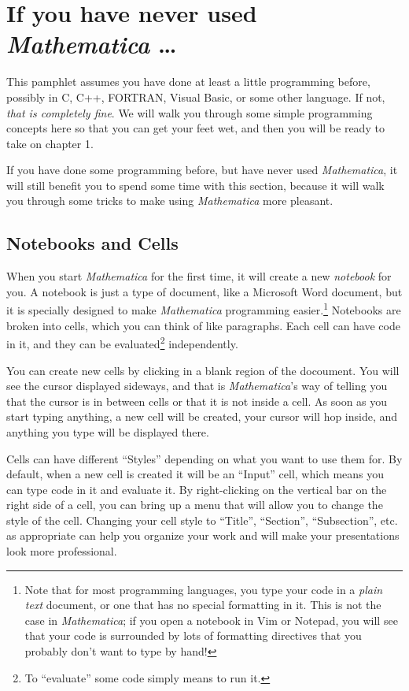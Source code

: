 \chapter*{If you have never used \emph{Mathematica} \ldots }
\label{chap:Prelim}

This pamphlet assumes you have done at least a little programming before, possibly in C, C++, FORTRAN, Visual Basic, or some other language. If not, \emph{that is completely fine}. We will walk you through some simple programming concepts here so that you can get your feet wet, and then you will be ready to take on chapter 1.

If you have done some programming before, but have never used \emph{Mathematica}, it will still benefit you to spend some time with this section, because it will walk you through some tricks to make using \emph{Mathematica} more pleasant.

\section{Notebooks and Cells}

When you start \emph{Mathematica} for the first time, it will create a new \emph{notebook} for you. A notebook is just a type of document, like a Microsoft Word document, but it is specially designed to make \emph{Mathematica} programming easier.\footnote{Note that for most programming languages, you type your code in a \emph{plain text} document, or one that has no special formatting in it. This is not the case in \emph{Mathematica}; if you open a notebook in Vim or Notepad, you will see that your code is surrounded by lots of formatting directives that you probably don't want to type by hand!} Notebooks are broken into cells, which you can think of like paragraphs. Each cell can have code in it, and they can be evaluated\footnote{To ``evaluate'' some code simply means to run it.} independently.

You can create new cells by clicking in a blank region of the docoument. You will see the cursor displayed sideways, and that is \emph{Mathematica}'s way of telling you that the cursor is in between cells or that it is not inside a cell. As soon as you start typing anything, a new cell will be created, your cursor will hop inside, and anything you type will be displayed there.

Cells can have different ``Styles'' depending on what you want to use them for. By default, when a new cell is created it will be an ``Input'' cell, which means you can type code in it and evaluate it. By right-clicking on the vertical bar on the right side of a cell, you can bring up a menu that will allow you to change the style of the cell. Changing your cell style to ``Title'', ``Section'', ``Subsection'', etc. as appropriate can help you organize your work and will make your presentations look more professional.

